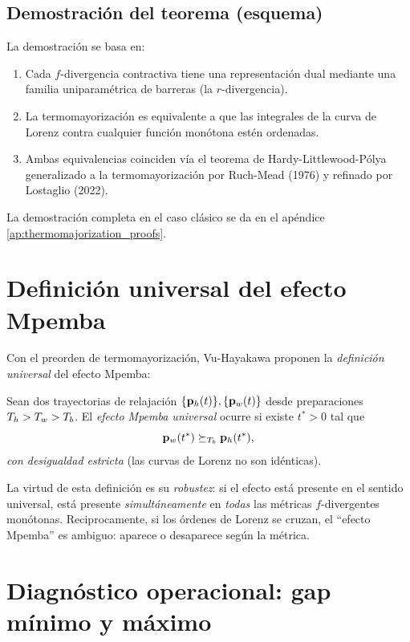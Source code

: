 \subsection{Demostración del teorema (esquema)}

La demostración se basa en:
\begin{enumerate}
\item Cada $f$-divergencia contractiva tiene una representación dual mediante 
una familia uniparamétrica de barreras (la $r$-divergencia).
\item La termomayorización es equivalente a que las integrales de la curva de 
Lorenz contra cualquier función monótona estén ordenadas.
\item Ambas equivalencias coinciden vía el teorema de Hardy-Littlewood-Pólya 
generalizado a la termomayorización por Ruch-Mead (1976) y refinado por 
Lostaglio (2022).
\end{enumerate}

\noindent La demostración completa en el caso clásico se da en el apéndice 
\ref{ap:thermomajorization_proofs}.

\section{Definición universal del efecto Mpemba}

Con el preorden de termomayorización, Vu-Hayakawa proponen la \emph{definición 
universal} del efecto Mpemba:

\begin{definition}
\label{def:mpemba_universal}
Sean dos trayectorias de relajación $\{\vb{p}_h(t)\}, \{\vb{p}_w(t)\}$ desde 
preparaciones $T_{h} > T_{w} > T_{b}$. El \emph{efecto Mpemba universal} ocurre si 
existe $t^{\ast} > 0$ tal que
\begin{equation}
    \vb{p}_w(t^{\ast}) \succeq_{T_{b}} \vb{p}_h(t^{\ast}),
\end{equation}
\emph{con desigualdad estricta} (las curvas de Lorenz no son idénticas).
\end{definition}

\noindent La virtud de esta definición es su \emph{robustez}: si el efecto está 
presente en el sentido universal, está presente \emph{simultáneamente} en 
\emph{todas} las métricas $f$-divergentes monótonas. Reciprocamente, si los 
órdenes de Lorenz se cruzan, el ``efecto Mpemba'' es ambiguo: aparece o 
desaparece según la métrica.

\section{Diagnóstico operacional: gap mínimo y máximo}

